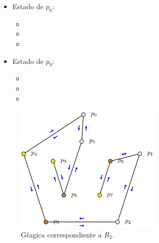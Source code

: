 \begin{multicols}{2}
\begin{itemize}
\begin{itemize}
      \item {}
      \end{itemize}

\item Estado de $p_8$:
      \begin{itemize}
      \item {}
      
      \item {}
      
      \item {}
      \end{itemize}

\item Estado de $p_9$:
      \begin{itemize}
      \item {}
      
      \item {}
      
      \item {}
      \end{itemize}

\end{itemize}
\end{multicols} 

\begin{figure}[ht]
        \begin{center}
                \includegraphics[width=7cm]{R2.png}
                \caption{Gŕagica correspondiente a $R_2$.}
        \end{center}
\end{figure}

